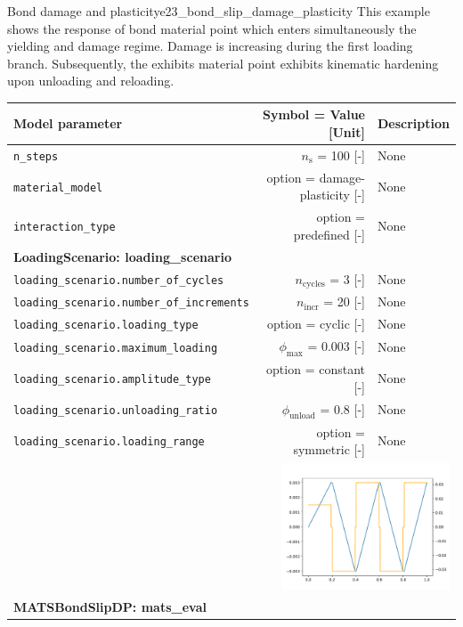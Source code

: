 \documentclass[main.tex]{subfiles}
\begin{document}
\begin{bmcsex}{Bond damage and plasticity}{e23_bond_slip_damage_plasticity}
\noindent This example shows the response of bond material point 
which enters simultaneously the yielding and damage regime. Damage is 
increasing during the first loading branch. Subsequently, the exhibits
material point exhibits kinematic hardening upon unloading and reloading.
 \\
\begin{center}
            
{\scriptsize 
\begin{longtable}{lrp{4cm}}\toprule
\textbf{\textsf{Model parameter}} 
& 
\textbf{\textsf{Symbol = Value [Unit]}} 
&
\textbf{\textsf{Description}}  \\\midrule \midrule
\texttt{n\_steps} & $n_\mathrm{s}$ = 100 [-] & {\footnotesize None}  \\
            \texttt{material\_model} & option = damage-plasticity [-] & {\footnotesize None}  \\
            \texttt{interaction\_type} & option = predefined [-] & {\footnotesize None}  \\
            \midrule
\multicolumn{3}{l}{\textbf{\textsf{LoadingScenario: loading\_scenario}}}\\

\texttt{loading\_scenario.number\_of\_cycles} & $n_\mathrm{cycles}$ = 3 [-] & {\footnotesize None}  \\
            \texttt{loading\_scenario.number\_of\_increments} & $n_{\mathrm{incr}}$ = 20 [-] & {\footnotesize None}  \\
            \texttt{loading\_scenario.loading\_type} & option = cyclic [-] & {\footnotesize None}  \\
            \texttt{loading\_scenario.maximum\_loading} & $\phi_{\max}$ = 0.003 [-] & {\footnotesize None}  \\
            \texttt{loading\_scenario.amplitude\_type} & option = constant [-] & {\footnotesize None}  \\
            \texttt{loading\_scenario.unloading\_ratio} & $\phi_{\mathrm{unload}}$ = 0.8 [-] & {\footnotesize None}  \\
            \texttt{loading\_scenario.loading\_range} & option = symmetric [-] & {\footnotesize None}  \\
            
\multicolumn{3}{r}{\includegraphics[width=5cm]{examples/e23_bond_slip_damage_plasticity/fig_loading_scenario.pdf}}\\
\midrule
\multicolumn{3}{l}{\textbf{\textsf{MATSBondSlipDP: mats\_eval}}}\\


\end{longtable}}
\end{center}
\end{bmcsex}
\end{document}
